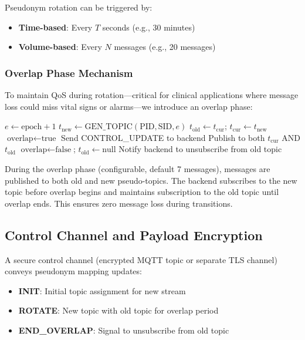 \documentclass[conference]{IEEEtran}
\begin{document}
Pseudonym rotation can be triggered by:
\begin{itemize}
    \item \textbf{Time-based}: Every $T$ seconds (e.g., 30 minutes)
    \item \textbf{Volume-based}: Every $N$ messages (e.g., 20 messages)
\end{itemize}

\subsubsection{Overlap Phase Mechanism}

To maintain QoS during rotation---critical for clinical applications where message loss could miss vital signs or alarms---we introduce an overlap phase:

\begin{algorithm}
\caption{Pseudonym Rotation with Overlap}
\label{alg:rotation}
\begin{algorithmic}[1]
\STATE $e \gets \text{epoch} + 1$
\STATE $t_{\text{new}} \gets \text{GEN\_TOPIC}(\text{PID}, \text{SID}, e)$
\STATE $t_{\text{old}} \gets t_{\text{cur}}$; $t_{\text{cur}} \gets t_{\text{new}}$
\STATE $\text{overlap} \gets \text{true}$
\STATE Send CONTROL\_UPDATE to backend
    \STATE Publish to both $t_{\text{cur}}$ AND $t_{\text{old}}$
\ENDFOR
\STATE $\text{overlap} \gets \text{false}$; $t_{\text{old}} \gets \text{null}$
\STATE Notify backend to unsubscribe from old topic
\end{algorithmic}
\end{algorithm}

During the overlap phase (configurable, default 7 messages), messages are published to both old and new pseudo-topics. The backend subscribes to the new topic before overlap begins and maintains subscription to the old topic until overlap ends. This ensures zero message loss during transitions.

\subsection{Control Channel and Payload Encryption}

A secure control channel (encrypted MQTT topic or separate TLS channel) conveys pseudonym mapping updates:

\begin{itemize}
    \item \textbf{INIT}: Initial topic assignment for new stream
    \item \textbf{ROTATE}: New topic with old topic for overlap period
    \item \textbf{END\_OVERLAP}: Signal to unsubscribe from old topic
\end{itemize}
\end{document}
